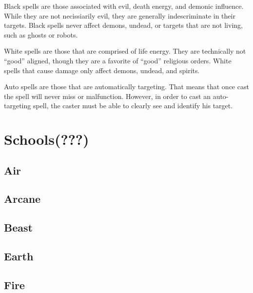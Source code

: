 \documentclass[twoside]{book}
\begin{document}
              
                  Black   spells are those
                  associated with evil, death energy, and demonic
                  influence. While they are not necissiarily evil, they
                  are generally indescriminate in their targets. Black
                  spells never affect demons, undead, or targets that are
                  not living, such as ghosts or robots.
                
              
                  White   spells are those
                  that are comprised of life energy. They are technically
                  not “good” aligned, though they are a
                  favorite of “good” religious orders. White
                  spells that cause damage only affect demons, undead,
                  and spirits.
                
              
                  Auto   spells are those that
                  are automatically targeting. That means that once cast
                  the spell will never miss or malfunction. However, in
                  order to cast an auto-targeting spell, the caster must
                  be able to clearly see and identify his target.
                
            
\section{Schools(???)}
    
\subsection{Air}
    
\subsection{Arcane}
    
\subsection{Beast}
    
\subsection{Earth}
    
\subsection{Fire}
    
\end{document}
